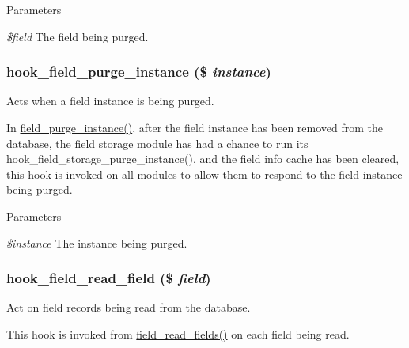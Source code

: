 \begin{DoxyParams}{Parameters}
\item[{\em \$field}]The field being purged. \end{DoxyParams}
\hypertarget{group__field__crud_gaefbe3afc4ad006fb3566204930f0e186}{
\subsubsection[{hook\_\-field\_\-purge\_\-instance}]{\setlength{\rightskip}{0pt plus 5cm}hook\_\-field\_\-purge\_\-instance (\$ {\em instance})}}
\label{group__field__crud_gaefbe3afc4ad006fb3566204930f0e186}
Acts when a field instance is being purged.

In \hyperlink{group__field__purge_ga766cee439c7c920d3d406c7af41c8968}{field\_\-purge\_\-instance()}, after the field instance has been removed from the database, the field storage module has had a chance to run its hook\_\-field\_\-storage\_\-purge\_\-instance(), and the field info cache has been cleared, this hook is invoked on all modules to allow them to respond to the field instance being purged.


\begin{DoxyParams}{Parameters}
\item[{\em \$instance}]The instance being purged. \end{DoxyParams}
\hypertarget{group__field__crud_gaef26e203f796171adad2a4d3ffa9eb3f}{
\subsubsection[{hook\_\-field\_\-read\_\-field}]{\setlength{\rightskip}{0pt plus 5cm}hook\_\-field\_\-read\_\-field (\$ {\em field})}}
\label{group__field__crud_gaef26e203f796171adad2a4d3ffa9eb3f}
Act on field records being read from the database.

This hook is invoked from \hyperlink{group__field__crud_ga0dae5c311ea301668c8906d2711fb3c5}{field\_\-read\_\-fields()} on each field being read.


